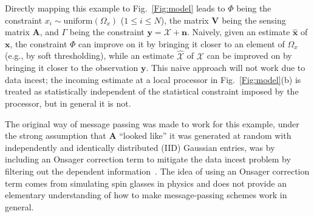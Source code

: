 \documentclass[journal]{IEEEtran}
\renewcommand{\bf}{\bm}
\begin{document}
Directly mapping this example to Fig.~\ref{Fig:model} leads to $\Phi$ being the constraint $x_i \sim \textrm{uniform}(\Omega_x)$ ($1 \leq i \leq N$), the matrix $\bf{V}$ being the sensing matrix $\bf{A}$, and $\Gamma$ being the constraint $\bf{y} = \bf{\mathcal{X}} + \bf{n}$. Naively, given an estimate $\hat{\bf{x}}$ of $\bf{x}$, the constraint $\Phi$ can improve on it by bringing it closer to an element of $\Omega_x$ (e.g., by soft thresholding), while an estimate $\hat{\bf{\mathcal{X}}}$ of $\bf{\mathcal{X}}$ can be improved on by bringing it closer to the observation $\bf{y}$. This naive approach will not work due to data incest; the incoming estimate at a local processor in Fig.~\ref{Fig:model}(b) is treated as statistically independent of the statistical constraint imposed by the processor, but in general it is not.

The original way of message passing was made to work for this example, under the strong assumption that $\bf{A}$ ``looked like'' it was generated at random with independently and identically distributed (IID) Gaussian entries, was by including an Onsager correction term to mitigate the data incest problem by filtering out the dependent information~\cite{Donoho2009}. The idea of using an Onsager correction term comes from simulating spin glasses in physics and does not provide an elementary understanding of how to make message-passing schemes work in general.



\end{document}
